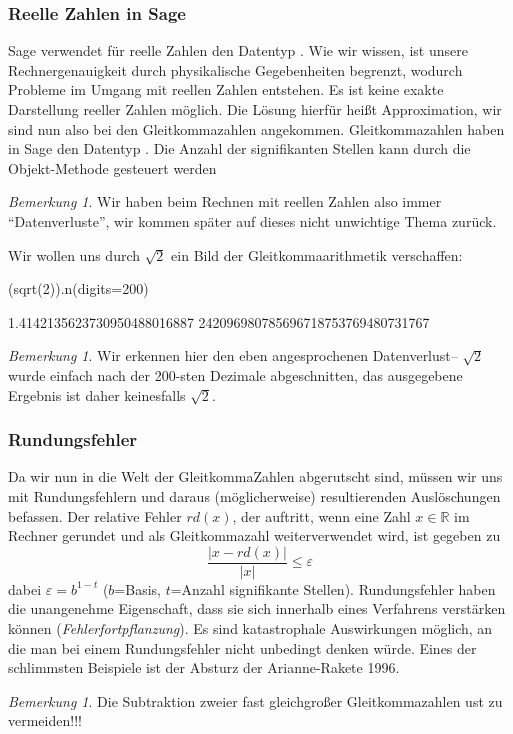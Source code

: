 \documentclass[fontsize=12pt,paper=a4,twoside,bibtotoc,idxtotoc,
liststotoc,pagesize,BCOR1.2cm,DIV15,chapterprefix,pagesize=pdftex]{scrbook}
\theoremstyle{plain}
\theoremstyle{definition}
\theoremstyle{remark}
\newtheorem{bem}[equation]{Bemerkung}
\begin{document}
\subsubsection{Reelle Zahlen in Sage}
Sage verwendet für reelle Zahlen den Datentyp . Wie wir wissen, ist unsere Rechnergenauigkeit durch physikalische 
Gegebenheiten begrenzt, wodurch Probleme im Umgang mit reellen Zahlen entstehen. Es ist keine exakte Darstellung reeller Zahlen 
möglich. Die Lösung hierfür heißt Approximation, wir sind nun also bei den Gleitkommazahlen angekommen. Gleitkommazahlen haben in 
Sage den Datentyp .
 Die Anzahl der signifikanten Stellen kann durch die Objekt-Methode  gesteuert werden
\begin{bem}
 Wir haben beim Rechnen mit reellen Zahlen also immer ``Datenverluste'', wir kommen später auf dieses nicht unwichtige Thema zurück.
\end{bem}
Wir wollen uns durch $\sqrt{2}$ ein Bild der Gleitkommaarithmetik verschaffen:
\begin{sagein}
(sqrt(2)).n(digits=200)
\end{sagein}
\begin{sage}
1.4142135623730950488016887
242096980785696718753769480731767
\end{sage}
\begin{bem}
 Wir erkennen hier den eben angesprochenen Datenverlust-- $\sqrt{2}$ wurde einfach nach der 200-sten Dezimale abgeschnitten, das ausgegebene 
Ergebnis ist daher keinesfalls $\sqrt{2}$.
\end{bem}
\subsubsection{Rundungsfehler}
Da wir nun in die Welt der GleitkommaZahlen abgerutscht sind, müssen wir uns mit Rundungsfehlern und daraus (möglicherweise) 
resultierenden Auslöschungen befassen. Der relative Fehler $rd(x)$, der auftritt, wenn eine Zahl $x \in \mathbb{R}$ im Rechner 
gerundet und als Gleitkommazahl weiterverwendet wird, ist gegeben zu
\[ \frac{|x -rd(x)|}{|x|} \leq \varepsilon \]
dabei $\varepsilon=b^{1-t}$ ($b$=Basis, $t$=Anzahl signifikante Stellen).
 Rundungsfehler haben die unangenehme Eigenschaft, dass sie sich innerhalb eines Verfahrens verstärken können ({\it Fehlerfortpflanzung}).
Es sind katastrophale Auswirkungen möglich, an die man bei einem Rundungsfehler nicht unbedingt denken würde. Eines der schlimmsten 
Beispiele ist der Absturz der Arianne-Rakete 1996.
\begin{bem}
 Die Subtraktion zweier fast gleichgroßer Gleitkommazahlen ust zu vermeiden!!!
\end{bem}
\end{document}
